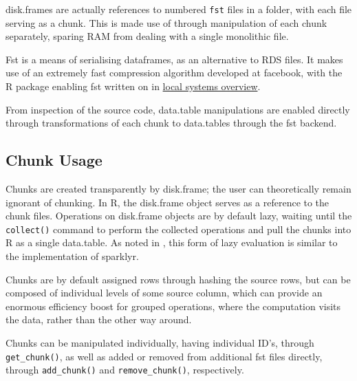 \documentclass[10pt,a4paper]{article}
\begin{document}
disk.frames are actually references to numbered \texttt{fst} files in
a folder, with each file serving as a chunk. This is made use of
through manipulation of each chunk separately, sparing RAM from
dealing with a single monolithic file\cite{zj19:_inges_data}.

Fst is a means of serialising dataframes, as an alternative to RDS
files\cite{klik19}. It makes use of an extremely fast compression
algorithm developed at facebook, with the R package enabling fst
written on in \href{local-systems-overview.pdf}{local systems
  overview}.

From inspection of the source code, data.table manipulations are
enabled directly through transformations of each chunk to data.tables
through the fst backend.

\subsection{Chunk Usage}
\label{sec:making-chunks}

Chunks are created transparently by disk.frame; the user can
theoretically remain ignorant of chunking. In R, the disk.frame object
serves as a reference to the chunk files. Operations on disk.frame
objects are by default lazy, waiting until the \texttt{collect()}
command to perform the collected operations and pull the chunks into R
as a single data.table. As noted in
\cite{zj19:_simpl_verbs_lazy_evaluat}, this form of lazy evaluation is
similar to the implementation of sparklyr.

Chunks are by default assigned rows through hashing the source rows,
but can be composed of individual levels of some source column, which
can provide an enormous efficiency boost for grouped operations, where
the computation visits the data, rather than the other way around.

Chunks can be manipulated individually, having individual ID's,
through \texttt{get\_chunk()}, as well as added or removed from
additional fst files directly, through \texttt{add\_chunk()} and
\texttt{remove\_chunk()}, respectively.
\end{document}
